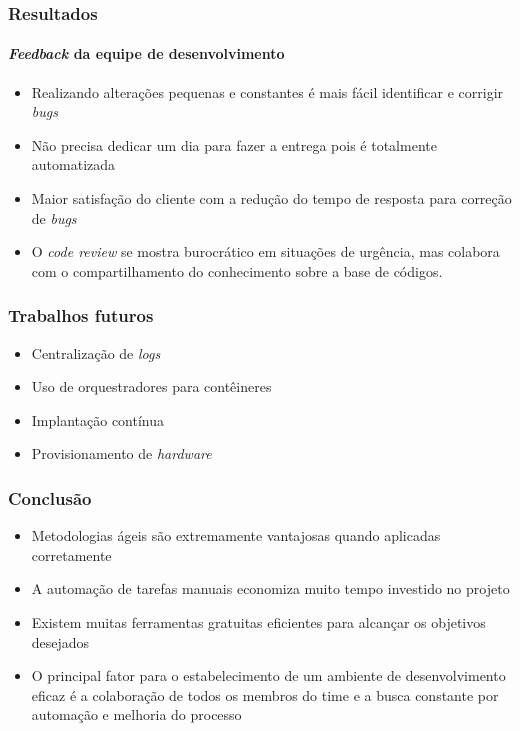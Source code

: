 \documentclass[aspectratio=169]{beamer}
\begin{document}
\begin{frame}
	\frametitle{Resultados}
	\framesubtitle{\textit{Feedback} da equipe de desenvolvimento}
	
	\begin{itemize}
		
		\item Realizando alterações pequenas e constantes é mais fácil identificar e corrigir \textit{bugs}
		
		\item Não precisa dedicar um dia para fazer a entrega pois é totalmente automatizada
		
		\item Maior satisfação do cliente com a redução do tempo de resposta para correção de \textit{bugs} 
		
		\item O \textit{code review} se mostra burocrático em situações de urgência, mas colabora com o compartilhamento do conhecimento sobre a base de códigos.
		
	\end{itemize}
	
\end{frame}

\begin{frame}
	\frametitle{Trabalhos futuros}
	
	\begin{itemize}
		
		\item Centralização de \textit{logs}
		
		\item Uso de orquestradores para contêineres
		
		\item Implantação contínua
		
		\item Provisionamento de \textit{hardware}
		
	\end{itemize}
	
\end{frame}

\begin{frame}
	\frametitle{Conclusão}
	
	\begin{itemize}
		
		\item Metodologias ágeis são extremamente vantajosas quando aplicadas corretamente
		
		\item A automação de tarefas manuais economiza muito tempo investido no projeto
		
		\item Existem muitas ferramentas gratuitas eficientes para alcançar os objetivos desejados
		
		\item O principal fator para o estabelecimento de um ambiente de desenvolvimento eficaz é a colaboração de todos os membros do time e a busca constante por automação e melhoria do processo
		
	\end{itemize}
	
\end{frame}
\end{document}
